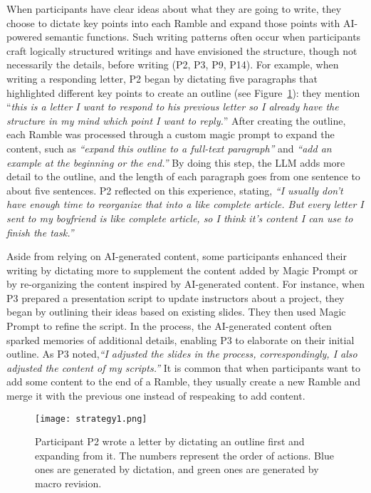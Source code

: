 When participants have clear ideas about what they are going to write, they choose to dictate key points into each Ramble and expand those points with AI-powered semantic functions. Such writing patterns often occur when participants craft logically structured writings and have envisioned the structure, though not necessarily the details, before writing (P2, P3, P9, P14). For example, when writing a responding letter, P2 began by dictating five paragraphs that highlighted different key points to create an outline (see Figure~\ref{fig:str1}): they mention ``\textit{this is a letter I want to respond to his previous letter so I already have the structure in my mind which point I want to reply.}'' After creating the outline, each Ramble was processed through a custom magic prompt to expand the content, such as \textit{``expand this outline to a full-text paragraph''} and \textit{``add an example at the beginning or the end.''} By doing this step, the LLM adds more detail to the outline, and the length of each paragraph goes from one sentence to about five sentences. P2 reflected on this experience, stating, \textit{``I usually don't have enough time to reorganize that into a like complete article. But every letter I sent to my boyfriend is like complete article, so I think it's content I can use to finish the task.''}

Aside from relying on AI-generated content, some participants enhanced their writing by dictating more to supplement the content added by Magic Prompt or by re-organizing the content inspired by AI-generated content.
For instance, when P3 prepared a presentation script to update instructors about a project, they began by outlining their ideas based on existing slides. They then used Magic Prompt to refine the script. In the process, the AI-generated content often sparked memories of additional details, enabling P3 to elaborate on their initial outline. As P3 noted,\textit{``I adjusted the slides in the process, correspondingly, I also adjusted the content of my scripts.''}
It is common that when participants want to add some content to the end of a Ramble, they usually create a new Ramble and merge it with the previous one instead of respeaking to add content.

\begin{figure}
    \centering
    \texttt{[image: strategy1.png]}
    \caption{Participant P2 wrote a letter by dictating an outline first and expanding from it. The numbers represent the order of actions. Blue ones are generated by dictation, and green ones are generated by macro revision.}
    \label{fig:str1}
\end{figure}

